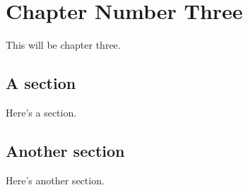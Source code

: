 \chapter{Chapter Number Three}

This will be chapter three.

\section{A section}

Here's a section.

\section{Another section}

Here's another section.  


